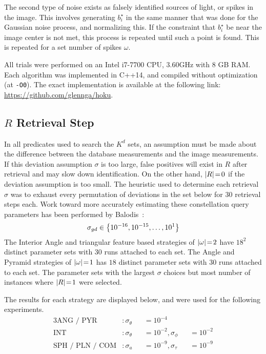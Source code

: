 The second type of noise exists as falsely identified sources of light, or spikes in the image.
This involves generating $b^\star_i$ in the same manner that was done for the Gaussian noise process, and normalizing
this.
If the constraint that $b^\star_i$ be near the image center is not met, this process is repeated until such a point is
found.
This is repeated for a set number of spikes $\omega$.

All trials were performed on an Intel i7-7700 CPU, 3.60GHz with 8 GB RAM\@.
Each algorithm was implemented in C++14, and compiled without optimization (at \texttt{-O0}).
The exact implementation is available at the following link:
\url{https://github.com/glennga/hoku}.

\subsection{$R$ Retrieval Step}\label{subsec:catalogQueryStep}
In all predicates used to search the $K^d$ sets, an assumption must be made about the difference between the database
measurements and the image measurements.
If this deviation assumption $\sigma$ is too large, false positives will exist in $R$ after retrieval and may slow
down identification.
On the other hand, $\left| R \right| \!=\! 0$ if the deviation assumption is too small.
The heuristic used to determine each retrieval $\sigma$ was to exhaust every permutation of deviations in the set below for
30 retrieval steps each.
Work toward more accurately estimating these constellation query parameters has been performed by
Balodis~\cite{balodis:parametersAutomated}:
\begin{equation}
    \sigma_{gd} \in \left\{  10^{-16}, 10^{-15}, \ldots, 10^1  \right\}
\end{equation}
The Interior Angle and triangular feature based strategies of $\left| \omega \right| \!=\! 2$ have $18^2$ distinct parameter sets
with 30 runs attached to each set.
The Angle and Pyramid strategies of $\left| \omega \right| \!=\! 1$ has $18$ distinct parameter sets with 30 runs attached to
each set.
The parameter sets with the largest $\sigma$ choices but most number of instances where $\left| R \right| \!=\! 1$ were selected.

The results for each strategy are displayed below, and were used for the following experiments.
\begin{alignat*}{3}
    \text{ANG / PYR}&: \sigma_\theta &&= 10^{-4} &&{}\\
    \text{INT}&: \sigma_\theta &&= 10^{-2}, \sigma_\phi &&= 10^{-2} \\
    \text{SPH / PLN / COM}&: \sigma_a &&= 10^{-9}, \sigma_\tau &&= 10^{-9}
\end{alignat*}

